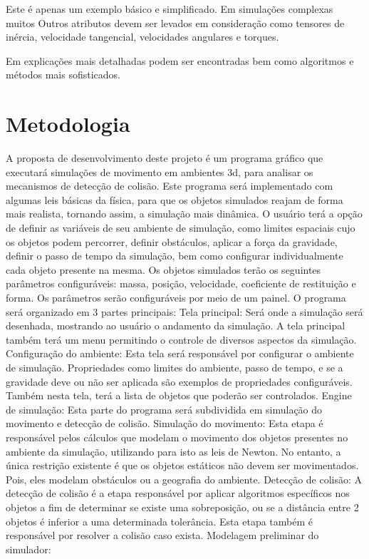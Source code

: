 Este é apenas um exemplo básico e simplificado. Em simulações complexas muitos
Outros atributos devem ser levados em consideração como tensores de inércia,
velocidade tangencial, velocidades angulares e torques.

Em  explicações mais detalhadas podem ser encontradas bem como algoritmos e
métodos mais sofisticados.


\section{Metodologia}

A  proposta de desenvolvimento deste projeto é um programa gráfico que
executará simulações de movimento em ambientes 3d, para analisar os mecanismos de detecção de colisão.
Este programa será implementado com algumas leis básicas da física, para que os objetos simulados reajam de forma mais realista,  tornando assim, a simulação mais dinâmica.
O usuário terá a opção de definir as variáveis de seu ambiente de simulação, como limites espaciais cujo os objetos podem percorrer, definir obstáculos, aplicar a força da gravidade,
definir o passo de tempo da simulação, bem como configurar individualmente cada
objeto presente na mesma.
Os objetos simulados terão os seguintes parâmetros configuráveis: massa,
posição, velocidade, coeficiente de restituição e forma. Os parâmetros serão configuráveis por meio de um painel.
O programa será organizado em 3 partes principais:
Tela principal:
Será onde a simulação será desenhada, mostrando ao usuário o andamento da simulação.
A tela principal também terá um menu permitindo o controle de diversos aspectos da simulação.
Configuração do ambiente:
Esta tela será responsável por configurar o ambiente de simulação. Propriedades
como limites do ambiente, passo de tempo, e se a gravidade deve ou não ser
aplicada são exemplos de propriedades configuráveis.
Também nesta tela, terá a lista de objetos que poderão ser controlados.
Engine de simulação:
Esta parte do programa será subdividida em simulação do movimento e detecção de colisão.
Simulação do movimento:
Esta etapa é responsável pelos cálculos que modelam o movimento dos objetos presentes no ambiente da simulação, utilizando para isto as leis de Newton.
No entanto, a  única restrição existente é que os objetos estáticos não devem ser movimentados. Pois, eles modelam obstáculos ou a geografia do ambiente.
Detecção de colisão:
A detecção de colisão é a etapa responsável por aplicar algoritmos específicos nos objetos a fim de determinar se existe uma sobreposição, ou se  a distância entre 2 objetos é inferior a uma determinada tolerância.
Esta etapa também é responsável por resolver a colisão caso exista.
Modelagem preliminar do simulador:


